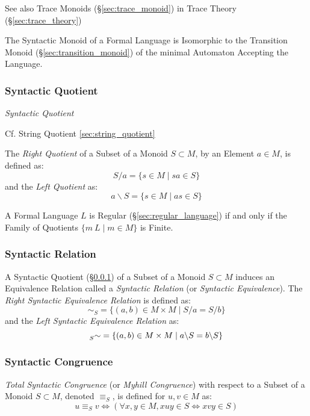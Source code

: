 \fist See also Trace Monoids (\S\ref{sec:trace_monoid}) in Trace
Theory (\S\ref{sec:trace_theory})

The Syntactic Monoid of a Formal Language is Isomorphic to the
Transition Monoid (\S\ref{sec:transition_monoid}) of the minimal
Automaton Accepting the Language.



\subsubsection{Syntactic Quotient}\label{sec:syntactic_quotient}

\emph{Syntactic Quotient}

\fist Cf. String Quotient \ref{sec:string_quotient}

The \emph{Right Quotient} of a Subset of a Monoid $S \subset M$, by an
Element $a \in M$, is defined as:
\[
  S / a = \{ s \in M\;|\;sa \in S \}
\]
and the \emph{Left Quotient} as:
\[
  a \backslash S = \{ s \in M\;|\;as \in S \}
\]

A Formal Language $L$ is Regular (\S\ref{sec:regular_language}) if and
only if the Family of Quotients $\{ m \ L \;|\; m \in M \}$ is Finite.



\subsubsection{Syntactic Relation}\label{sec:syntactic_relation}

A Syntactic Quotient (\S\ref{sec:syntactic_quotient}) of a Subset of a
Monoid $S \subset M$ induces an Equivalence Relation called a
\emph{Syntactic Relation} (or \emph{Syntactic Equivalence}). The
\emph{Right Syntactic Equivalence Relation} is defined as:
\[
  \sim_S = \{ (a,b) \in M \times M \;|\; S/a = S/b\}
\]
and the \emph{Left Syntactic Equivalence Relation} as:
\[
  \prescript{}{S}{\sim} = \{ (a,b) \in M \times M \;|\;
  a \backslash S = b \backslash S \}
\]



\subsubsection{Syntactic Congruence}\label{sec:syntactic_congruence}

\emph{Total Syntactic Congruence} (or \emph{Myhill Congruence}) with
respect to a Subset of a Monoid $S \subset M$, denoted $\equiv_S$, is
defined for $u,v \in M$ as:
\[
  u \equiv_S v \Leftrightarrow
  (\forall x,y \in M, xuy \in S \Leftrightarrow xvy \in S)
\]



